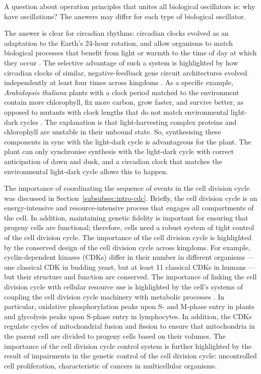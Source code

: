 A question about operation principles that unites all biological oscillators is: why have oscillations?
The answers may differ for each type of biological oscillator.

The answer is clear for circadian rhythms: circadian clocks evolved as an adaptation to the Earth's 24-hour rotation, and allow organisms to match biological processes that benefit from light or warmth to the time of day at which they occur \parencite{millarInputSignalsPlant2004}.
The selective advantage of such a system is highlighted by how circadian clocks of similar, negative-feedback gene circuit architectures evolved independently at least four times across kingdoms \parencite{doddPlantCircadianClocks2005}.
As a specific example, \textit{Arabidopsis thaliana} plants with a clock period matched to the environment contain more chlorophyll, fix more carbon, grow faster, and survive better, as opposed to mutants with clock lengths that do not match environmental light-dark cycles \parencite{doddPlantCircadianClocks2005}.
The explanation is that light-harvesting complex proteins and chlorophyll are unstable in their unbound state.
So, synthesising these components in sync with the light-dark cycle is advantageous for the plant.
The plant can only synchronise synthesis with the light-dark cycle with correct anticipation of dawn and dusk, and a circadian clock that matches the environmental light-dark cycle allows this to happen.

The importance of coordinating the sequence of events in the cell division cycle was discussed in Section~\ref{subsubsec:intro-cdc}.
Briefly, the cell division cycle is an energy-intensive and resource-intensive process that engages all compartments of the cell.
In addition, maintaining genetic fidelity is important for ensuring that progeny cells are functional; therefore, cells need a robust system of tight control of the cell division cycle.
The importance of the cell division cycle is highlighted by the conserved design of the cell division cycle across kingdoms.
For example, cyclin-dependent kinases (CDKs) differ in their number in different organisms --- one classical CDK in budding yeast, but at least 11 classical CDKs in humans \parencite{malumbresCyclindependentKinasesFamily2009} --- but their structure and function are conserved.
The importance of linking the cell division cycle with cellular resource use is highlighted by the cell's systems of coupling the cell division cycle machinery with metabolic processes \parencite{salazar-roaFuelingCellDivision2017}.
In particular, oxidative phosphorylation peaks upon S- and M-phase entry in plants and glycolysis peaks upon S-phase entry in lymphocytes.
In addition, the CDKs regulate cycles of mitochondrial fusion and fission to ensure that mitochondria in the parent cell are divided to progeny cells based on their volumes.
The importance of the cell division cycle control system is further highlighted by the result of impairments in the genetic control of the cell division cycle: uncontrolled cell proliferation, characteristic of cancers in multicellular organisms.

